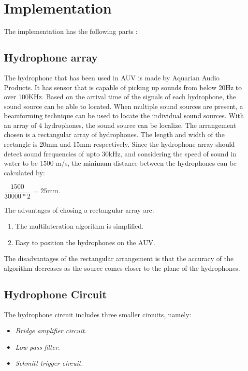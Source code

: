\section{Implementation}\label{sec:implementation}
The implementation has the following parts :

\subsection{Hydrophone array}
The hydrophone that has been used in AUV is made by Aquarian Audio Products. It has sensor that is capable of picking up sounds from below 20Hz to over 100KHz. Based on the arrival time of the signals of each hydrophone, the sound source can be able to located. When multiple sound sources are present, a beamforming technique can be used to locate the individual sound sources. \newline
With an array of 4 hydrophones, the sound source can be localize. The arrangement chosen is a rectangular array of hydrophones. The length and width of the rectangle is 20mm and 15mm respectively. Since the hydrophone array should detect sound frequencies of upto 30kHz, and considering the speed of sound in water to be 1500 m/s, the minimum distance between the hydrophones can be calculated by:
\begin{center}
$\dfrac{1500}{30000 * 2}$ = 25mm.
\end{center}

The advantages of chosing a rectangular array are:\begin{enumerate}
\item The multilateration algorithm is simplified.
\item Easy to position the hydrophones on the AUV.
\end{enumerate}
The disadvantages of the rectangular arrangement is that the accuracy of the algorithm decreases as the source comes closer to the plane of the hydrophones. 


\subsection{Hydrophone Circuit}
The hydrophone circuit includes three smaller circuits, namely:
\begin{itemize}
   \item { \em Bridge amplifier circuit.}
   \item { \em Low pass filter. }
   \item { \em Schmitt trigger circuit. }
\end{itemize}
